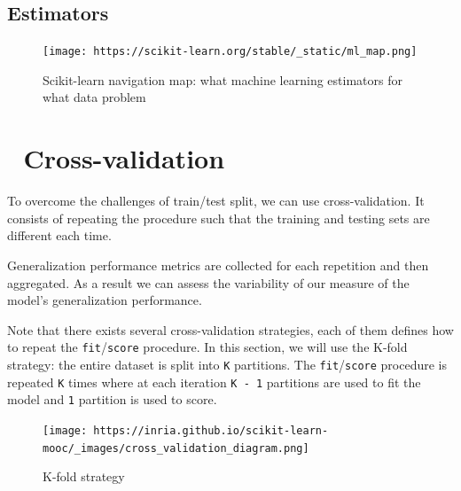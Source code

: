 \documentclass[
  letterpaper,
  DIV=11,
  numbers=noendperiod,
  oneside]{scrreprt}
\begin{document}
\hypertarget{estimators}{%
\section{Estimators}\label{estimators}}

\begin{figure}

{\centering \texttt{[image: https://scikit-learn.org/stable/\_static/ml\_map.png]}

}

\caption{Scikit-learn navigation map: what machine learning estimators
for what data problem}

\end{figure}

\hypertarget{cross-validation}{%
\chapter{\texorpdfstring{{📙}
Cross-validation}{📙 Cross-validation}}\label{cross-validation}}

To overcome the challenges of train/test split, we can use
cross-validation. It consists of repeating the procedure such that the
training and testing sets are different each time.

Generalization performance metrics are collected for each repetition and
then aggregated. As a result we can assess the variability of our
measure of the model's generalization performance.

Note that there exists several cross-validation strategies, each of them
defines how to repeat the \texttt{fit}/\texttt{score} procedure. In this
section, we will use the K-fold strategy: the entire dataset is split
into \texttt{K} partitions. The \texttt{fit}/\texttt{score} procedure is
repeated \texttt{K} times where at each iteration \texttt{K\ -\ 1}
partitions are used to fit the model and \texttt{1} partition is used to
score.

\begin{figure}

{\centering \texttt{[image: https://inria.github.io/scikit-learn-mooc/\_images/cross\_validation\_diagram.png]}

}

\caption{K-fold strategy}

\end{figure}
\end{document}
